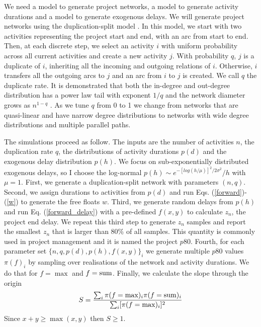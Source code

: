\documentclass[reprint,aps,prl,amsmath,amssymb,superscriptaddress,showpacs]{revtex4-1}
\begin{document}
We need a model to generate project networks, a model to generate activity durations and a model to generate exogenous delays. We will generate project networks using the duplication-split model \cite{vazquez22}. In this model, we start with two activities representing the project start and end, with an arc from start to end. Then, at each discrete step, we select an activity  $i$ with uniform probability across all current activities and create a new activity $j$. With probability $q$, $j$ is a duplicate of $i$, inheriting all the incoming and outgoing relations of $i$. Otherwise, $i$ transfers all the outgoing arcs to $j$ and an arc from $i$ to $j$ is created. We call $q$ the duplicate rate.  It is demonstrated that both the in-degree and out-degree distribution has a power law tail with exponent $1/q$ and the network diameter grows as $n^{1-q}$ \cite{vazquez22}. As we tune $q$ from 0 to 1 we change from networks that are quasi-linear and have narrow degree distributions to networks with wide degree distributions and multiple parallel paths.

The simulations proceed as follow. The inputs are the number of activities $n$, the duplication rate $q$, the distributions of activity durations $p(d)$ and the exogenous delay distribution $p(h)$. We focus on sub-exponentially distributed exogenous delays, so I choose the log-normal $p(h)\sim e^{-[log(h/\mu)]^2/2\sigma^2}/h$ with $\mu=1$. First, we generate a duplication-split network  with parameters $(n,q)$. Second, we assign durations to activities from $p(d)$ and run Eqs. (\ref{forward})-(\ref{w}) to generate the free floats $w$. Third, we generate random delays from $p(h)$ and run Eq. (\ref{forward_delay}) with a pre-defined $f(x,y)$ to calculate $z_n$, the project end delay. We repeat this third step to generate $z_n$ samples and report the smallest $z_n$ that is larger than 80\% of all samples. This quantity is commonly used in project management and it is named the project $p80$. Fourth, for each parameter set $\{n,q,p(d),p(h),f(x,y)\}_i$ we generate multiple $p80$ values $\pi(f)_i$ by sampling over realisations of the network and activity durations. We do that for $f=\max$ and $f={\rm sum}$. Finally, we calculate the slope through the origin
%
\begin{equation}
S = \frac{ \sum_i \pi(f={\max})_i \pi(f={\rm sum})_i }{ \sum_i [\pi(f={\max})_i]^2 }
\label{slope}
\end{equation}
%
Since $x+y\geq\max(x,y)$ then $S\geq1$.
\end{document}

